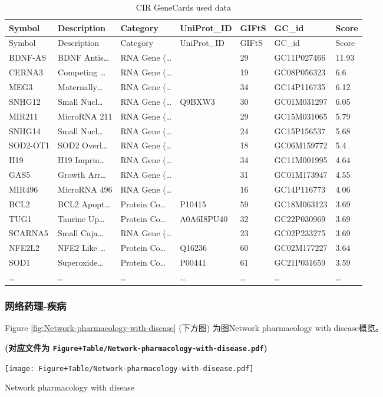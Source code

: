 \documentclass[
]{article}
\begin{document}
\begin{longtable}[]{@{}lllllll@{}}
\caption{\label{tab:CIR-GeneCards-used-data}CIR GeneCards used data}\tabularnewline
\toprule
Symbol & Description & Category & UniProt\_ID & GIFtS & GC\_id & Score\tabularnewline
\midrule
\endfirsthead
\toprule
Symbol & Description & Category & UniProt\_ID & GIFtS & GC\_id & Score\tabularnewline
\midrule
\endhead
BDNF-AS & BDNF Antis\ldots{} & RNA Gene (\ldots{} & & 29 & GC11P027466 & 11.93\tabularnewline
CERNA3 & Competing \ldots{} & RNA Gene (\ldots{} & & 19 & GC08P056323 & 6.6\tabularnewline
MEG3 & Maternally\ldots{} & RNA Gene (\ldots{} & & 34 & GC14P116735 & 6.12\tabularnewline
SNHG12 & Small Nucl\ldots{} & RNA Gene (\ldots{} & Q9BXW3 & 30 & GC01M031297 & 6.05\tabularnewline
MIR211 & MicroRNA 211 & RNA Gene (\ldots{} & & 29 & GC15M031065 & 5.79\tabularnewline
SNHG14 & Small Nucl\ldots{} & RNA Gene (\ldots{} & & 24 & GC15P156537 & 5.68\tabularnewline
SOD2-OT1 & SOD2 Overl\ldots{} & RNA Gene (\ldots{} & & 18 & GC06M159772 & 5.4\tabularnewline
H19 & H19 Imprin\ldots{} & RNA Gene (\ldots{} & & 34 & GC11M001995 & 4.64\tabularnewline
GAS5 & Growth Arr\ldots{} & RNA Gene (\ldots{} & & 31 & GC01M173947 & 4.55\tabularnewline
MIR496 & MicroRNA 496 & RNA Gene (\ldots{} & & 16 & GC14P116773 & 4.06\tabularnewline
BCL2 & BCL2 Apopt\ldots{} & Protein Co\ldots{} & P10415 & 59 & GC18M063123 & 3.69\tabularnewline
TUG1 & Taurine Up\ldots{} & Protein Co\ldots{} & A0A6I8PU40 & 32 & GC22P030969 & 3.69\tabularnewline
SCARNA5 & Small Caja\ldots{} & RNA Gene (\ldots{} & & 23 & GC02P233275 & 3.69\tabularnewline
NFE2L2 & NFE2 Like \ldots{} & Protein Co\ldots{} & Q16236 & 60 & GC02M177227 & 3.64\tabularnewline
SOD1 & Superoxide\ldots{} & Protein Co\ldots{} & P00441 & 61 & GC21P031659 & 3.59\tabularnewline
\ldots{} & \ldots{} & \ldots{} & \ldots{} & \ldots{} & \ldots{} & \ldots{}\tabularnewline
\bottomrule
\end{longtable}

\hypertarget{ux7f51ux7edcux836fux7406-ux75beux75c5}{%
\subsubsection{网络药理-疾病}\label{ux7f51ux7edcux836fux7406-ux75beux75c5}}

Figure \ref{fig:Network-pharmacology-with-disease} (下方图) 为图Network pharmacology with disease概览。

\textbf{(对应文件为 \texttt{Figure+Table/Network-pharmacology-with-disease.pdf})}

\def\@captype{figure}
\begin{center}
\texttt{[image: Figure+Table/Network-pharmacology-with-disease.pdf]}
\caption{Network pharmacology with disease}\label{fig:Network-pharmacology-with-disease}
\end{center}
\end{document}

